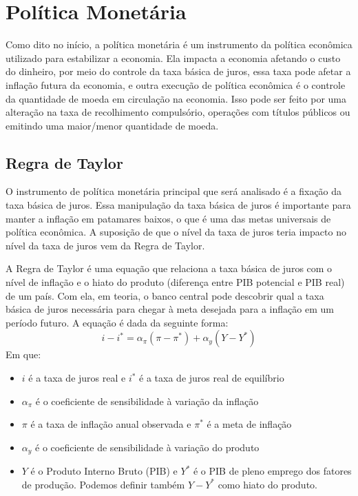 \section*{Política Monetária}
Como dito no início, a política monetária é um instrumento da política econômica utilizado para estabilizar a economia. Ela impacta a economia afetando o custo do dinheiro, por meio do controle da taxa básica de juros, essa taxa pode afetar a inflação futura da economia, e outra execução de política econômica é o controle da quantidade de moeda em circulação na economia. Isso pode ser feito por uma alteração na taxa de recolhimento compulsório, operações com títulos públicos ou emitindo uma maior/menor quantidade de moeda. 	
\subsection*{Regra de Taylor}
O instrumento de política monetária principal que será analisado é a fixação da taxa básica de juros. Essa manipulação da taxa básica de juros é importante para manter a inflação em patamares baixos, o que é uma das metas universais de política econômica. A suposição de que o nível da taxa de juros teria impacto no nível da taxa de juros vem da Regra de Taylor. 

A Regra de Taylor é uma equação que relaciona a taxa básica de juros com o nível de inflação e o hiato do produto (diferença entre PIB potencial e PIB real) de um país. Com ela, em teoria, o banco central pode descobrir qual a taxa básica de juros necessária para chegar à meta desejada para a inflação em um período futuro. A equação é dada da seguinte forma:
\begin{equation}
    i - i^{*} = \alpha_{\pi}(\pi - \pi^{*}) + \alpha_{y}(Y - Y^{*})
\end{equation}
Em que:
\begin{itemize}
    \item $i$ é a taxa de juros real e $i^{*}$ é a taxa de juros real de equilíbrio
    \item $\alpha_{\pi}$ é o coeficiente de sensibilidade à variação da inflação
    \item $\pi$ é a taxa de inflação anual observada e $\pi^{*}$ é a meta de inflação
    \item $\alpha_{y}$ é o coeficiente de sensibilidade à variação do produto 
    \item $Y$ é o Produto Interno Bruto (PIB) e $Y^{*}$ é o PIB de pleno emprego dos fatores de produção. Podemos definir também $Y - Y^{*}$ como hiato do produto.
\end{itemize}
